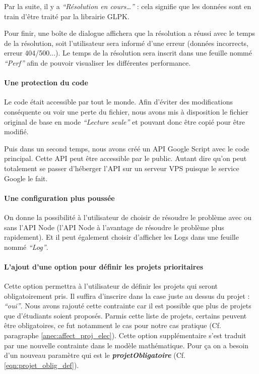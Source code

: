 \documentclass[final,poster]{polytech/polytech}
\begin{document}
Par la suite, il y a \textit{“Résolution en cours…”} : cela signifie que les données sont en train d'être traité par la librairie GLPK.

Pour finir, une boîte de dialogue affichera que la résolution a réussi avec le temps de la résolution, soit l'utilisateur sera informé d'une erreur (données incorrects, erreur 404/500...). Le temps de la résolution sera inscrit dans une feuille nommé \textit{“Perf”} afin de pouvoir visualiser les différentes performance.

\paragraph{Une protection du code}
Le code était accessible par tout le monde. Afin d'éviter des modifications conséquente ou voir une perte du fichier, nous avons mis à disposition le fichier original de base en mode \textit{“Lecture seule”} et pouvant donc être copié pour être modifié. 

Puis dans un second temps, nous avons créé un API Google Script avec le code principal. Cette API peut être accessible par le public. Autant dire qu'on peut totalement se passer d'héberger l'API sur un serveur VPS puisque le service Google le fait.

\paragraph{Une configuration plus poussée}
On donne la possibilité à l'utilisateur de choisir de résoudre le problème avec ou sans l’API Node (l’API Node à l'avantage de résoudre le problème plus rapidement). Et il peut également choisir d'afficher les Logs dans une feuille nommé \textit{“Log”}.

\paragraph{L'ajout d'une option pour définir les projets prioritaires}
Cette option permettra à l'utilisateur de définir les projets qui seront obligatoirement pris. Il suffira d'inscrire dans la case juste au dessus du projet : \textit{“oui”}. 
Nous avons rajouté cette contrainte car il est possible que plus de projets que d'étudiants soient proposés. Parmis cette liste de projets, certains peuvent être obligatoires, ce fut notamment le cas pour notre cas pratique (Cf. paragraphe \autoref{anec:affect_proj_elec}).
Cette option supplémentaire s'est traduit par une nouvelle contrainte dans le modèle mathématique. Pour ça on a besoin d'un nouveau paramètre qui est le \textbf{\textit{projetObligatoire}} (Cf. \autoref{eqn:projet_oblig_def}).
\end{document}
